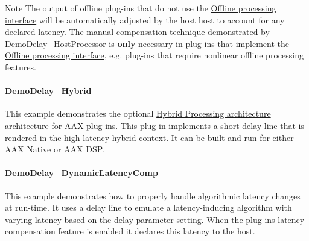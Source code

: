 \begin{DoxyNote}{Note}
The output of offline plug-\/ins that do not use the \hyperlink{a00334}{Offline processing interface} will be automatically adjusted by the host host to account for any declared latency. The manual compensation technique demonstrated by Demo\+Delay\+\_\+\+Host\+Processor is {\bfseries only} necessary in plug-\/ins that implement the \hyperlink{a00334}{Offline processing interface}, e.\+g. plug-\/ins that require nonlinear offline processing features.
\end{DoxyNote}
\hypertarget{a00376_DemoDelay_Hybrid}{}\paragraph{Demo\+Delay\+\_\+\+Hybrid}\label{a00376_DemoDelay_Hybrid}
This example demonstrates the optional \hyperlink{a00335}{Hybrid Processing architecture} architecture for A\+A\+X plug-\/ins. This plug-\/in implements a short delay line that is rendered in the high-\/latency hybrid context. It can be built and run for either A\+A\+X Native or A\+A\+X D\+S\+P.\hypertarget{a00376_DemoDelay_DynamicLatencyComp}{}\paragraph{Demo\+Delay\+\_\+\+Dynamic\+Latency\+Comp}\label{a00376_DemoDelay_DynamicLatencyComp}
This example demonstrates how to properly handle algorithmic latency changes at run-\/time. It uses a delay line to emulate a latency-\/inducing algorithm with varying latency based on the delay parameter setting. When the plug-\/in\textquotesingle{}s latency compensation feature is enabled it declares this latency to the host.

